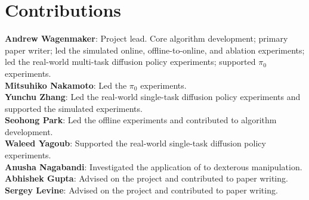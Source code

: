 
\newcommand{\actmag}{b_{\cW}}



\section*{Contributions}
\textbf{Andrew Wagenmaker}: Project lead. Core algorithm development; primary paper writer; led the simulated online, offline-to-online, and ablation experiments; led the real-world multi-task diffusion policy experiments; supported $\pi_0$ experiments. \\
\textbf{Mitsuhiko Nakamoto}: Led the $\pi_0$ experiments. \\
\textbf{Yunchu Zhang}: Led the real-world single-task diffusion policy experiments and supported the simulated experiments. \\
\textbf{Seohong Park}: Led the offline experiments and contributed to algorithm development. \\
\textbf{Waleed Yagoub}: Supported the real-world single-task diffusion policy experiments. \\
\textbf{Anusha Nagabandi}: Investigated the application of \algname to dexterous manipulation. \\
\textbf{Abhishek Gupta}: Advised on the project and contributed to paper writing. \\
\textbf{Sergey Levine}: Advised on the project and contributed to paper writing. 


